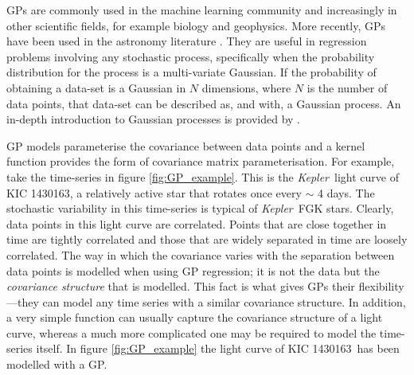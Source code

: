 \documentclass[useAMS, usenatbib, preprint, 12pt]{aastex}
\newcommand{\kepexample}{1430163}
\newcommand{\Kepler}{{\it Kepler}}
\newcommand{\kepler}{\Kepler}
\newcommand{\eg}{{\it e.g.}}
\begin{document}
GPs are commonly used in the machine learning community and increasingly
in other scientific fields, for example biology and geophysics.
More recently, GPs have been used in the astronomy literature \citep[see
\eg][]{Gibson2012, Haywood2014, Haywood2015, Evans2015, Rajpaul2015,
Rajpaul2016, Aigrain2016}.
They are useful in regression problems involving any stochastic process,
specifically when the probability distribution for the process is a
multi-variate Gaussian.
If the probability of obtaining a data-set is a Gaussian in $N$ dimensions,
where $N$ is the number of data points, that data-set can be described as, and
with, a Gaussian process.
An in-depth introduction to Gaussian processes is provided by
\citet{Rasmussen2005}.

GP models parameterise the covariance between data points and a kernel
function provides the form of covariance matrix parameterisation.
For example, take the time-series in figure \ref{fig:GP_example}.
This is the \kepler\ light curve of KIC \kepexample, a relatively active star that
rotates once every $\sim$ 4 days.
The stochastic variability in this time-series is typical of \kepler\ FGK
stars.
Clearly, data points in this light curve are correlated.
Points that are close together in time are tightly correlated and those that
are widely separated in time are loosely correlated.
The way in which the covariance varies with the separation between data points
is modelled when using GP regression; it is not the data but the {\it
covariance structure} that is modelled.
This fact is what gives GPs their flexibility---they can model any time
series with a similar covariance structure.
In addition, a very simple function can usually capture the covariance
structure of a light curve, whereas a much more complicated one may be
required to model the time-series itself.
In figure \ref{fig:GP_example} the light curve of KIC \kepexample\ has been
modelled with a GP.
\end{document}
